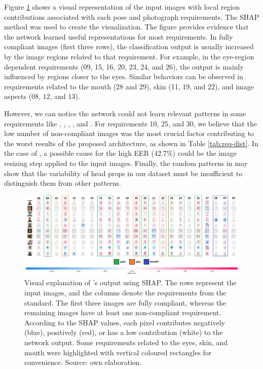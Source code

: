 Figure \ref{fig:shap} shows a visual representation of the input images with local region contributions associated with each pose and photograph requirements. The SHAP \citep{shap2018} method was used to create the visualization. The figure provides evidence that the network learned useful representations for most requirements. In fully compliant images (first three rows), the classification output is usually increased by the image regions related to that requirement. For example, in the eye-region dependent requirements (09, 15, 16, 20, 23, 24, and 26), the output is mainly influenced by regions closer to the eyes. Similar behaviors can be observed in requirements related to the mouth (28 and 29), skin (11, 19, and 22), and image aspects (08, 12, and 13). 
 
However, we can notice the network could not learn relevant patterns in some requirements like \inkmarked, \pixelation, \framestooheavy, \hatcap, and \otherfacesortoys. For requirements 10, 25, and 30, we believe that the low number of non-compliant images was the most crucial factor contributing to the worst results of the proposed architecture, as shown in Table \ref{tab:req-dist}. In the case of \pixelation, a possible cause for the high EER (42.7\%) could be the image resizing step applied to the input images. Finally, the random patterns in \hatcap may show that the variability of head props in our dataset must be insufficient to distinguish them from other patterns. 
 
\begin{landscape}
\begin{figure}[tb]
\centering
\includegraphics[width=\linewidth]{images/network_viz/shap.png}
\caption{Visual explanation of \methodname's output using SHAP. The rows represent the input images, and the columns denote the requirements from the \icao standard. The first three images are fully compliant, whereas the remaining images have at least one non-compliant requirement. According to the SHAP values, each pixel contributes negatively (blue), positively (red), or has a low contribution (white) to the network output. Some requirements related to the eyes, skin, and mouth were highlighted with vertical coloured rectangles for convenience. Source: own elaboration.}
\label{fig:shap}
\end{figure}
\end{landscape}
 